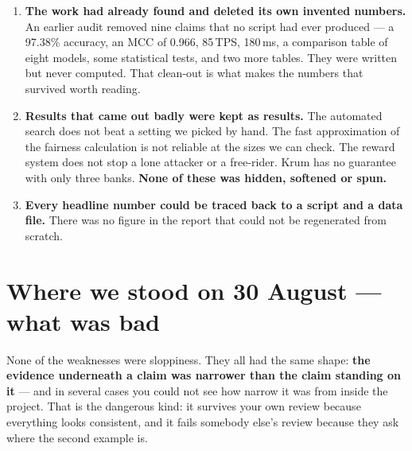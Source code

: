 \documentclass[11pt]{article}
\begin{document}
\begin{enumerate}[label=\textbf{G\arabic*.}]
  \item \textbf{The work had already found and deleted its own invented numbers.} An earlier audit
  removed nine claims that no script had ever produced --- a 97.38\% accuracy, an MCC of 0.966, 85\,TPS,
  180\,ms, a comparison table of eight models, some statistical tests, and two more tables. They were
  written but never computed. That clean-out is what makes the numbers that survived worth reading.

  \item \textbf{Results that came out badly were kept as results.} The automated search does not beat a
  setting we picked by hand. The fast approximation of the fairness calculation is not reliable at the
  sizes we can check. The reward system does not stop a lone attacker or a free-rider. Krum has no
  guarantee with only three banks. \textbf{None of these was hidden, softened or spun.}

  \item \textbf{Every headline number could be traced back to a script and a data file.} There was no
  figure in the report that could not be regenerated from scratch.
\end{enumerate}

\section{Where we stood on 30 August --- what was bad}
\label{sec:bad}

None of the weaknesses were sloppiness. They all had the same shape: \textbf{the evidence underneath a
claim was narrower than the claim standing on it} --- and in several cases you could not see how narrow
it was from inside the project. That is the dangerous kind: it survives your own review because
everything looks consistent, and it fails somebody else's review because they ask where the second
example is.
\end{document}
